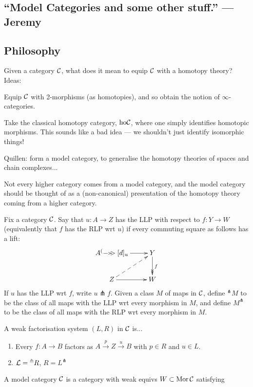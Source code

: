 \documentclass[11pt]{article}
\newcommand{\KanSemResponse}[1]
{
\thispagestyle{fancy}
\subsection*{#1}
}
\begin{document}
\begin{JeremyModelPractice}
\KanSemResponse
{``Model Categories and some other stuff.'' --- Jeremy}
\subsection*{Philosophy}
Given a category $\mathcal{C}$, what does it mean to equip $\mathcal{C}$ with a homotopy theory? Ideas:

\begin{itemise}
\item Equip $\mathcal{C}$ with 2-morphisms (as homotopies), and so obtain the notion of $\infty$-categories.
\item Take the classical homotopy category, $\textup{ho}\mathcal{C}$, where one simply identifies homotopic morphisms. This sounds like a bad idea --- we shouldn't just identify isomorphic things!
\item Quillen: form a model category, to generalise the homotopy theories of spaces and chain complexes...
\end{itemise}
Not every higher category comes from a model category, and the model category should be thought of as a (non-canonical) presentation of the homotopy theory coming from a higher category.
\begin{defn*}
Fix a category $\mathcal{C}$. Say that $u:A\to Z$ has the LLP with respect to $f:Y\to W$ (equivalently that $f$ has the RLP wrt $u$) if every commuting square as follows has a lift:
\[\xymatrix{
A\ar[r]\xycofib[d]_u&Y\ar@{->>}[d]^f\\
Z\ar@{-->}[ru]\ar[r]&W
}\]
If $u$ has the LLP wrt $f$, write $u\pitchfork f$. Given a class $M$ of maps in $\mathcal{C}$, define $^\pitchfork M$ to be the class of all maps with the LLP wrt every morphism in $M$, and define $ M^\pitchfork$ to be the class of all maps with the RLP wrt every morphism in $M$.
\end{defn*}
\begin{defn*}
A weak factorisation system $(L,R)$ in $\mathcal{C}$ is...
\begin{enumerate}\squishlist
\item Every $f:A\to B$ factors as $A\overset{p}{\to} Z\overset{u}{\to} B$ with $p\in R$ and $u\in L$.
\item $\mathcal{L}={^\pitchfork R}$, $R=L^\pitchfork$
\end{enumerate}
\end{defn*}
\begin{defn*}
A model category $\mathcal{C}$ is a category with weak equivs $W\subset\operatorname{Mor}\mathcal{C}$ satisfying
\begin{enumerate}\squishlist

\end{enumerate}
\end{defn*}
\end{JeremyModelPractice}
\end{document}
